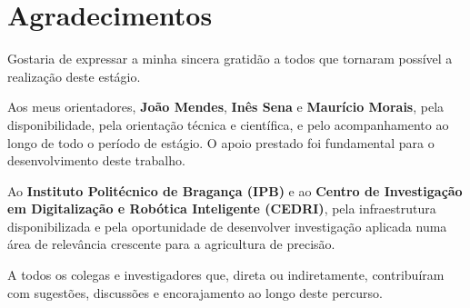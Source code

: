 \chapter*{Agradecimentos}

Gostaria de expressar a minha sincera gratidão a todos que tornaram possível
a realização deste estágio.

Aos meus orientadores, \textbf{João Mendes}, \textbf{Inês Sena} e
\textbf{Maurício Morais}, pela disponibilidade, pela orientação técnica e
científica, e pelo acompanhamento ao longo de todo o período de estágio.
O apoio prestado foi fundamental para o desenvolvimento deste trabalho.

Ao \textbf{Instituto Politécnico de Bragança (IPB)} e ao \textbf{Centro de
Investigação em Digitalização e Robótica Inteligente (CEDRI)}, pela
infraestrutura disponibilizada e pela oportunidade de desenvolver investigação
aplicada numa área de relevância crescente para a agricultura de precisão.

A todos os colegas e investigadores que, direta ou indiretamente, contribuíram
com sugestões, discussões e encorajamento ao longo deste percurso.

\clearpage

